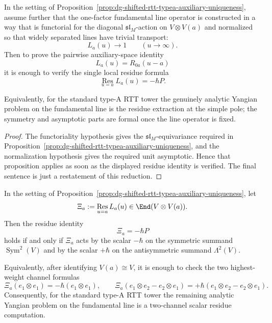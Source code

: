 \begin{corollary}
\label{cor:dg-shifted-rtt-typea-residue-reduction}
In the setting of
Proposition~\ref{prop:dg-shifted-rtt-typea-auxiliary-uniqueness},
assume further that the one-factor fundamental line operator is
constructed in a way that is functorial for the diagonal
$\mathfrak{sl}_M$-action on $V\otimes V(a)$ and normalized so that
widely separated lines have trivial transport:
\[
L_a(u)\to 1
\qquad (u\to\infty).
\]
Then to prove the pairwise auxiliary-space identity
\[
L_a(u)=R_{0a}(u-a)
\]
it is enough to verify the single local residue formula
\[
\operatorname*{Res}_{u=a}L_a(u)=-\hbar P.
\]

Equivalently, for the standard type-A RTT tower the genuinely analytic
Yangian problem on the fundamental line is the residue extraction at
the simple pole; the symmetry and asymptotic parts are formal once the
line operator is fixed.
\end{corollary}

\begin{proof}
The functoriality hypothesis gives the $\mathfrak{sl}_M$-equivariance
required in
Proposition~\ref{prop:dg-shifted-rtt-typea-auxiliary-uniqueness}, and
the normalization hypothesis gives the required unit asymptotic. Hence
that proposition applies as soon as the displayed residue identity is
verified. The final sentence is just a restatement of this reduction.
\end{proof}

\begin{proposition}
\label{prop:dg-shifted-rtt-typea-residue-channels}
In the setting of
Proposition~\ref{prop:dg-shifted-rtt-typea-auxiliary-uniqueness}, let
\[
\Xi_a:=\operatorname*{Res}_{u=a}L_a(u)\in \End(V\otimes V(a)).
\]
Then the residue identity
\[
\Xi_a=-\hbar P
\]
holds if and only if $\Xi_a$ acts by the scalar $-\hbar$ on the
symmetric summand $\operatorname{Sym}^2(V)$ and by the scalar $+\hbar$ on the
antisymmetric summand $\Lambda^2(V)$.

Equivalently, after identifying $V(a)\cong V$, it is enough to check
the two highest-weight channel formulas
\[
\Xi_a(e_1\otimes e_1)=-\hbar(e_1\otimes e_1),
\qquad
\Xi_a(e_1\otimes e_2-e_2\otimes e_1)
=+\hbar(e_1\otimes e_2-e_2\otimes e_1).
\]
Consequently, for the standard type-A RTT tower the remaining analytic
Yangian problem on the fundamental line is a two-channel scalar
residue computation.
\end{proposition}

